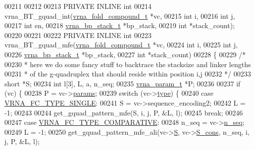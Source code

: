 \begin{DoxyCode}
00211 
00212 
00213 PRIVATE INLINE \textcolor{keywordtype}{int}
00214 vrna\_BT\_gquad\_int(\hyperlink{group__fold__compound_structvrna__fc__s}{vrna\_fold\_compound\_t}  *vc,
00215                   \textcolor{keywordtype}{int}                   i,
00216                   \textcolor{keywordtype}{int}                   j,
00217                   \textcolor{keywordtype}{int}                   en,
00218                   \hyperlink{group__data__structures_structvrna__bp__stack__s}{vrna\_bp\_stack\_t}       *bp\_stack,
00219                   \textcolor{keywordtype}{int}                   *stack\_count);
00220 
00221 
00222 PRIVATE INLINE \textcolor{keywordtype}{int}
00223 vrna\_BT\_gquad\_mfe(\hyperlink{group__fold__compound_structvrna__fc__s}{vrna\_fold\_compound\_t}  *vc,
00224                   \textcolor{keywordtype}{int}                   i,
00225                   \textcolor{keywordtype}{int}                   j,
00226                   \hyperlink{group__data__structures_structvrna__bp__stack__s}{vrna\_bp\_stack\_t}       *bp\_stack,
00227                   \textcolor{keywordtype}{int}                   *stack\_count)
00228 \{
00229   \textcolor{comment}{/*}
00230 \textcolor{comment}{   * here we do some fancy stuff to backtrace the stacksize and linker lengths}
00231 \textcolor{comment}{   * of the g-quadruplex that should reside within position i,j}
00232 \textcolor{comment}{   */}
00233   \textcolor{keywordtype}{short}         *S;
00234   \textcolor{keywordtype}{int}           l[3], L, a, n\_seq;
00235   \hyperlink{group__energy__parameters_structvrna__param__s}{vrna\_param\_t}  *P;
00236 
00237   \textcolor{keywordflow}{if} (vc) \{
00238     P = vc->\hyperlink{group__fold__compound_a19b8720c2c5321c1b97c830bd17566ea}{params};
00239     \textcolor{keywordflow}{switch} (vc->\hyperlink{group__fold__compound_ac5eab693deac9a1a40c2a95ac294707c}{type}) \{
00240       \textcolor{keywordflow}{case} \hyperlink{group__fold__compound_gga01a4ff86fa71deaaa5d1abbd95a1447da7e264dd3cf2dc9b6448caabcb7763cd6}{VRNA\_FC\_TYPE\_SINGLE}:
00241         S = vc->sequence\_encoding2;
00242         L = -1;
00243 
00244         get\_gquad\_pattern\_mfe(S, i, j, P, &L, l);
00245         \textcolor{keywordflow}{break};
00246 
00247       \textcolor{keywordflow}{case} \hyperlink{group__fold__compound_gga01a4ff86fa71deaaa5d1abbd95a1447dab821ce46ea3cf665be97df22a76f5023}{VRNA\_FC\_TYPE\_COMPARATIVE}:
00248         n\_seq = vc->\hyperlink{group__fold__compound_a614702ab74478e786272be44f8cebfe3}{n\_seq};
00249         L     = -1;
00250         get\_gquad\_pattern\_mfe\_ali(vc->\hyperlink{group__fold__compound_aebb37297f92c7bd22aac6343f8f61d61}{S}, vc->\hyperlink{group__fold__compound_aa3fab7ae38ebfed2028375221d295686}{S\_cons}, n\_seq, i, j, P, &L, l);

\end{DoxyCode}
